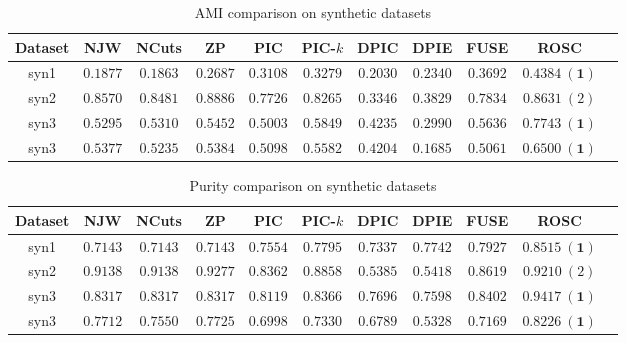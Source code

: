 {\begin{table}[!htbp]
\centering
\caption{AMI comparison on synthetic datasets}
\label{table:ami_synthetic}
\resizebox{0.8\linewidth}{!}
{
\begin{tabular}{|c|c|c|c|c|c|c|c|c|c|c|} \hline
Dataset &NJW & NCuts & ZP & PIC & PIC-$k$ & DPIC & DPIE & FUSE & ROSC \\ \hline 
syn1 & $0.1877$ & $0.1863$ & $0.2687$ & $0.3108$ & $0.3279$ & $0.2030$ & $0.2340$ & $0.3692$ & $\bm{0.4384\ (1)}$ \\ \hline
syn2 & $0.8570$ & $0.8481$ & $\bm{0.8886}$ & $0.7726$ & $0.8265$ & $0.3346$ & $0.3829$ & $0.7834$ & $0.8631\ (2)$ \\ \hline
syn3 & $0.5295$ & $0.5310$ & $0.5452$ & $0.5003$ & $0.5849$ & $0.4235$ & $0.2990$ & $0.5636$ & $\bm{0.7743\ (1)}$ \\ \hline
syn3 & $0.5377$ & $0.5235$ & $0.5384$ & $0.5098$ & $0.5582$ & $0.4204$ & $0.1685$ & $0.5061$ & $\bm{0.6500\ (1)}$ \\ \hline
\end{tabular}
}
\end{table}

\begin{table}[!htbp]
\centering
\caption{Purity comparison on synthetic datasets}
\label{table:purity_synthetic}
\resizebox{0.8\linewidth}{!}
{
\begin{tabular}{|c|c|c|c|c|c|c|c|c|c|c|} \hline
Dataset &NJW & NCuts & ZP & PIC & PIC-$k$ & DPIC & DPIE & FUSE & ROSC \\ \hline 
syn1 & $0.7143$ & $0.7143$ & $0.7143$ & $0.7554$ & $0.7795$ & $0.7337$ & $0.7742$ & $0.7927$ & $\bm{0.8515\ (1)}$ \\ \hline
syn2 & $0.9138$ & $0.9138$ & $\bm{0.9277}$ & $0.8362$ & $0.8858$ & $0.5385$ & $0.5418$ & $0.8619$ & $0.9210\ (2)$ \\ \hline
syn3 & $0.8317$ & $0.8317$ & $0.8317$ & $0.8119$ & $0.8366$ & $0.7696$ & $0.7598$ & $0.8402$ & $\bm{0.9417\ (1)}$ \\ \hline
syn3 & $0.7712$ & $0.7550$ & $0.7725$ & $0.6998$ & $0.7330$ & $0.6789$ & $0.5328$ & $0.7169$ & $\bm{0.8226\ (1)}$ \\ \hline
\end{tabular}
}
\end{table}

}
